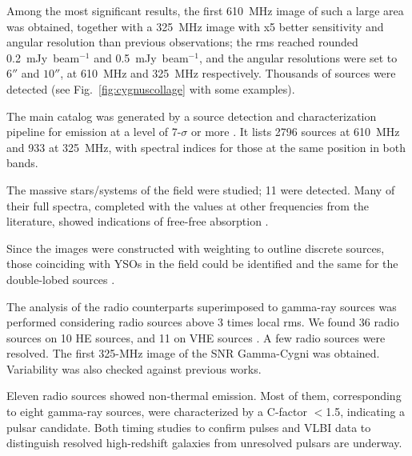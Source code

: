 \documentclass[baaa]{baaa}
\begin{document}
Among the most significant results, the first 610~MHz image of such a large area was obtained, together with a 325~MHz image with x5 better sensitivity and angular resolution than previous observations; the rms reached rounded 0.2~mJy~beam$^{-1}$ and 0.5~mJy~beam$^{-1}$, and the angular resolutions were set to $6''$ and $10''$, at 610~MHz and 325~MHz respectively. Thousands of sources were detected {(see Fig.~\ref{fig:cygnuscollage} with some  examples).}


The main catalog was generated by a source detection and characterization pipeline for emission at a level of 7-$\sigma$ or more \citep{benagliacat2020}. It lists 2796 sources at 610~MHz and 933 at 325~MHz, with spectral indices for those at the same position in both bands.

The massive stars/systems of the field were studied; 11 were detected. Many of their full spectra, completed with the values at other frequencies from the literature, showed indications of free-free absorption \citep{benagliamets2020}.



Since the images were constructed with weighting to outline discrete sources, those coinciding with YSOs in the field could be identified \citep[$\sim$30][]{isequilla2020} and the same for the double-lobed sources \citep[$\sim$40][]{saponara2021}. 

The analysis of the radio counterparts superimposed to gamma-ray sources was performed considering radio sources above 3 times local rms. We found 36 radio sources on 10 HE sources, and 11 on VHE sources \citep{benagliamets2020}. A few radio sources were resolved. The first 325-MHz image of the SNR Gamma-Cygni was obtained.
Variability was also checked against previous works.

Eleven radio sources showed non-thermal emission. Most of them, corresponding to eight gamma-ray sources, 
were characterized by a C-factor \citep[flux density/peak brightness,][]{frail2018} $<$1.5, indicating a pulsar candidate. 
Both timing studies to confirm pulses and VLBI data to distinguish resolved high-redshift galaxies from unresolved pulsars are underway.
\end{document}

